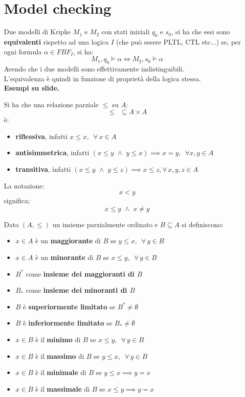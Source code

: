 \documentclass[a4paper,12pt, oneside]{book}
\begin{document}
\section{Model checking}
\begin{definizione}
  Due modelli di Kripke $M_1$ e $M_2$ con stati iniziali $q_0$ e $s_0$, si ha
  che essi sono \textbf{equivalenti} rispetto ad una logica $I$ (che può essere
  PLTL, CTL etc$\ldots$) se, per ogni formula $\alpha\in FBF_I$, si ha:
  \[M_1,q_0\vDash \alpha\iff M_2,s_0\vDash \alpha\]
  Avendo che i due modelli sono effettivamente indistinguibili.\\
  L'equivalenza è quindi in funzione di proprietà della logica stessa.\\
  \textbf{Esempi su slide.}
\end{definizione}
\begin{definizione}
  Si ha che una relazione parziale $\leq$ su $A$:
  \[\leq\,\,\, \subseteq A\times A\]
  è:
  \begin{itemize}
    \item \textbf{riflessiva}, infatti $x\leq x,\,\,\,\forall\,x\in A$ 
    \item \textbf{antisimmetrica}, infatti $(x\leq y\,\,\land\,\,y\leq
    x)\implies  x=y,\,\,\,\forall x,y\in A$
    \item \textbf{transitiva}, infatti $(x\leq y\,\,\land\,\, y\leq z)\implies
    x\leq z,\forall\,x,y,z\in A$
  \end{itemize}
  La notazione:
  \[x<y\]
  significa;
  \[x\leq y\,\,\land\,\,x\neq y\]
\end{definizione}
\begin{definizione}
  Dato $(A,\leq)$ un insieme parzialmente ordinato e $B\subseteq A$ si
  definiscono:
  \begin{itemize}
    \item $x\in A$ è un \textbf{maggiorante} di $B$ se $y\leq
    x,\,\,\,\forall\,y\in B$
    \item $x\in A$ è un \textbf{minorante} di $B$ se $x\leq
    y,\,\,\,\forall\,y\in B$
    \item $B^*$ come \textbf{insieme dei maggioranti di $B$}
    \item $B_*$ come \textbf{insieme dei minoranti di $B$}
    \item $B$ è \textbf{superiormente limitato} se $B^*\neq \emptyset$
    \item $B$ è \textbf{inferiormente limitato} se $B_*\neq \emptyset$
    \item $x\in B$ è il \textbf{minimo} di $B$ se $x\leq y,\,\,\,\forall\,y\in
    B$ 
    \item $x\in B$ è il \textbf{massimo} di $B$ se $y\leq x,\,\,\,\forall\,y\in
    B$
    \item $x\in B$ è il \textbf{minimale} di $B$ se $y\leq x\implies y=x$
    \item $x\in B$ è il \textbf{massimale} di $B$ se $x\leq y\implies y=x$
  \end{itemize}
\end{definizione}
\end{document}
